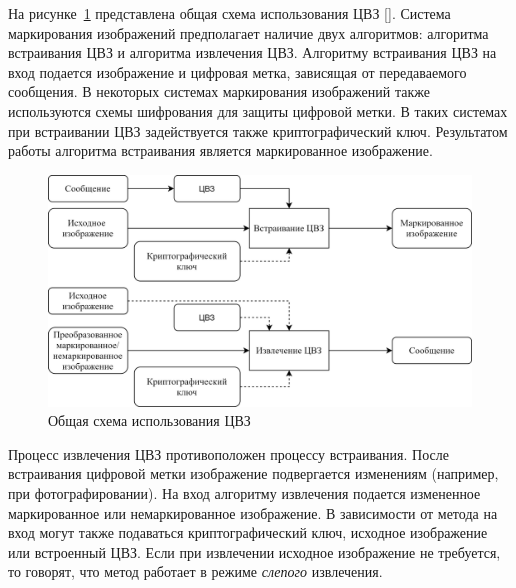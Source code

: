 \documentclass[12pt,a4paper]{article}
\begin{document}
На рисунке~\ref{fig:scheme} представлена общая схема использования ЦВЗ [].
Система маркирования изображений предполагает наличие двух алгоритмов: алгоритма встраивания ЦВЗ и алгоритма извлечения ЦВЗ. Алгоритму встраивания ЦВЗ на вход подается изображение и цифровая метка, зависящая от передаваемого сообщения.
В некоторых системах маркирования изображений также используются схемы шифрования для защиты цифровой метки.
В таких системах при встраивании ЦВЗ задействуется также криптографический ключ.
Результатом работы алгоритма встраивания является маркированное изображение.
\begin{figure}[h]
	
	\centering
	
	\includegraphics[width=1.0\linewidth]{Scheme.png}
	
	\caption{Общая схема использования ЦВЗ}
	
	\label{fig:scheme}
	
\end{figure}
Процесс извлечения ЦВЗ противоположен процессу встраивания.
После встраивания цифровой метки изображение подвергается изменениям (например, при фотографировании).
На вход алгоритму извлечения подается измененное маркированное или немаркированное изображение.
В зависимости от метода на вход могут также подаваться криптографический ключ, исходное изображение или встроенный ЦВЗ.
Если при извлечении исходное изображение не требуется, то говорят, что метод работает в режиме \textit{слепого} извлечения.
\end{document}

